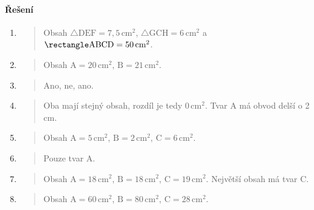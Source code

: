 \newpage

\paragraph{Řešení}
\begin{enumerate}
    \item
    \begin{quote}
        Obsah $\triangle\text{DEF} = 7,5\,\text{cm}^2$, $\triangle\text{GCH} = 6\,\text{cm}^2$ a $\rectangle\text{ABCD} = 50\,\text{cm}^2$.
    \end{quote}

    \item
    \begin{quote}
        Obsah $\text{A} = 20\,\text{cm}^2$, $\text{B} = 21\,\text{cm}^2$.
    \end{quote}

    \item
    \begin{quote}
        Ano, ne, ano.
    \end{quote}

    \item
    \begin{quote}
        Oba mají stejný obsah, rozdíl je tedy $0\,\text{cm}^2$.
        Tvar A má obvod delší o 2 cm.
    \end{quote}

    \item
    \begin{quote}
        Obsah $\text{A} = 5\,\text{cm}^2$, $\text{B} = 2\,\text{cm}^2$, $\text{C} = 6\,\text{cm}^2$.
    \end{quote}

    \item
    \begin{quote}
        Pouze tvar A\@.
    \end{quote}

    \item
    \begin{quote}
        Obsah $\text{A} = 18\,\text{cm}^2$, $\text{B} = 18\,\text{cm}^2$, $\text{C} = 19\,\text{cm}^2$.
        Největší obsah má tvar C\@.
    \end{quote}

    \item
    \begin{quote}
        Obsah $\text{A} = 60\,\text{cm}^2$, $\text{B} = 80\,\text{cm}^2$, $\text{C} = 28\,\text{cm}^2$.
    \end{quote}


\end{enumerate}
